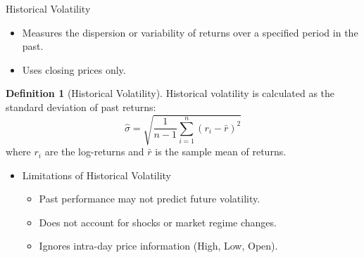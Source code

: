 \documentclass[9pt, aspectratio=169, t]{beamer}
\theoremstyle{definition}
\newtheorem{defn}{Definition}
\begin{document}
\begin{frame}{Historical Volatility}

\begin{itemize}
    \item Measures the dispersion or variability of returns over a specified period in the past.
    \item Uses closing prices only.
\end{itemize}

\vspace{0.3cm}

\begin{defn}[Historical Volatility]
Historical volatility is calculated as the standard deviation of past returns:
\[
\hat{\sigma} = \sqrt{\frac{1}{n-1}\sum_{i=1}^{n}(r_i - \bar{r})^2}
\]
where $r_i$ are the log-returns and $\bar{r}$ is the sample mean of returns.
\end{defn}

\vspace{0.3cm}

\begin{itemize}
    \item Limitations of Historical Volatility
    \begin{itemize}
        \item Past performance may not predict future volatility.
        \item Does not account for shocks or market regime changes.
        \item Ignores intra-day price information (High, Low, Open).
    \end{itemize}
\end{itemize}

\end{frame}
\end{document}
